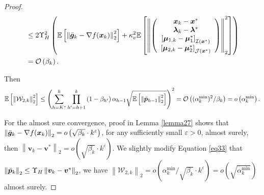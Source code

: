 \documentclass[aos]{imsart}
\numberwithin{equation}{section}
\theoremstyle{plain}
\begin{document}
\begin{appendix}
\begin{proof}
\begin{equation}
\begin{split}
            & \leq 2 \Upsilon_{H}^{2}  \left( \mathbb{E} \left[\left\| \Bar{\bm{g}}_k - \nabla f(\bm{x}_{k}) \right\|_2^2 \right] + \kappa_{v}^2 \mathbb{E} \left[ \left\|  \left( \begin{array}{c}
    \bm{x}_{k} - \bm{x}^{*}  \\
    \bm{\lambda}_{k} - \bm{\lambda}^{*} \\
    \left[ \bm{\mu}_{1,k} - \bm{\mu}_{1}^{*}\right]_{\mathcal{I}(\bm{x}^{*})} \\
    \left[ \bm{\mu}_{2,k} - \bm{\mu}_{2}^{*} \right]_{\mathcal{J}(\bm{x}^{*})} 
    \end{array} \right)  \right\|_2^2 \right]\right) \\
    & = \mathcal{O} \left( \beta_k \right).
        \end{split}
    \end{equation}

    Then 
    \begin{equation*}
        \begin{split}
            \mathbb{E} \left[ \left\|\mathcal{W}_{2,k} \right\|_2^2 \right] \leq \left( \sum_{h=K^{*}}^{k} \prod_{h^{\prime}=h+1}^{k} \left( 1- \beta_{h^{\prime}} \right) \alpha_{h-1} \sqrt{\mathbb{E} \left[\left\| \Bar{\bm{p}}_{h-1} \right\|_2^2 \right]} \right)^2 = \mathcal{O} \left(  (\alpha^{\min}_k)^2 / \beta_k \right) = o\left( \alpha^{\min}_k \right).
        \end{split}
    \end{equation*}

    For the almost sure convergence, proof in Lemma \ref{lemma27} shows that $\left\| \Bar{\bm{g}}_k - \nabla f(\bm{x}_{k}) \right\|_2 = o\left(\sqrt{\beta_k} \cdot k^{\varepsilon}  \right)$, for any sufficiently small $\varepsilon > 0$, almost surely, then $\left\| \bm{v}_{k} - \bm{v}^{*} \right\|_2 = o\left(\sqrt{\beta_k} \cdot k^{\varepsilon}  \right)$. We slightly modify Equation \eqref{eq33} that $\left\| \Bar{\bm{p}}_{k}\right\|_2 \leq \Upsilon_{H} \left\| \bm{v}_{k} - \bm{v}^{*} \right\|_2 $, we have $\left\|\mathcal{W}_{2,k} \right\|_2 = o\left( \alpha^{\min}_k / \sqrt{\beta_k} \cdot k^{\varepsilon}  \right) = o\left(\sqrt{\alpha^{\min}_k} \right)$ almost surely. 
\end{proof}




\end{appendix}
\end{document}
